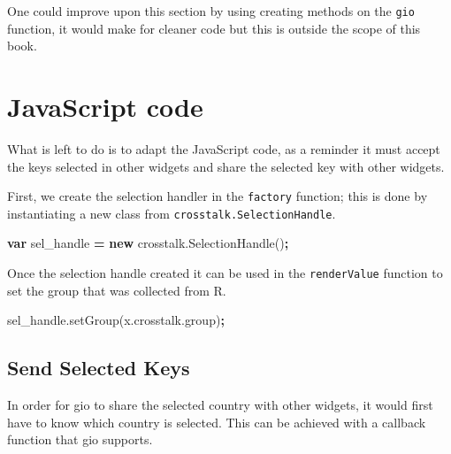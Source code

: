 \documentclass[10pt,]{krantz}
\makeatletter
\newenvironment{Shaded}{\begin{snugshade}}{\end{snugshade}}
\newcommand{\AttributeTok}[1]{\textcolor[rgb]{0.61,0.61,0.61}{#1}}
\newcommand{\KeywordTok}[1]{\textcolor[rgb]{0.27,0.27,0.27}{\textbf{#1}}}
\newcommand{\NormalTok}[1]{#1}
\newcommand{\OperatorTok}[1]{\textcolor[rgb]{0.43,0.43,0.43}{\textbf{#1}}}
\newcommand{\VariableTok}[1]{\textcolor[rgb]{0,0,0}{#1}}
\newenvironment{kframe}{%
\medskip{}
\setlength{\fboxsep}{.8em}
 \def\at@end@of@kframe{}%
 \ifinner\ifhmode%
  \def\at@end@of@kframe{\end{minipage}}%
  \begin{minipage}{\columnwidth}%
 \fi\fi%
 \def\FrameCommand##1{\hskip\@totalleftmargin \hskip-\fboxsep
 \colorbox{shadecolor}{##1}\hskip-\fboxsep
     \hskip-\linewidth \hskip-\@totalleftmargin \hskip\columnwidth}%
 \MakeFramed {\advance\hsize-\width
   \@totalleftmargin\z@ \linewidth\hsize
   \@setminipage}}%
 {\par\unskip\endMakeFramed%
 \at@end@of@kframe}
\renewenvironment{Shaded}{\begin{kframe}}{\end{kframe}}
\newenvironment{rmdblock}[1]
  {
  \begin{itemize}
  \renewcommand{\labelitemi}{
    \raisebox{-.7\height}[0pt][0pt]{
      {\setkeys{Gin}{width=3em,keepaspectratio}\texttt{[image: images/\#1]}}
    }
  }
  \setlength{\fboxsep}{1em}
  \begin{kframe}
  \item
  }
  {
  \end{kframe}
  \end{itemize}
  }
\newenvironment{rmdnote}
  {\begin{rmdblock}{note}}
  {\end{rmdblock}}
\makeatother
\begin{document}
\begin{rmdnote}
One could improve upon this section by using creating methods on the
\texttt{gio} function, it would make for cleaner code but this is
outside the scope of this book.
\end{rmdnote}

\hypertarget{linking-widgets-js}{%
\section{JavaScript code}\label{linking-widgets-js}}

What is left to do is to adapt the JavaScript code, as a reminder it must accept the keys selected in other widgets and share the selected key with other widgets.

First, we create the selection handler in the \texttt{factory} function; this is done by instantiating a new class from \texttt{crosstalk.SelectionHandle}.

\begin{Shaded}
\begin{Highlighting}[]
\KeywordTok{var}\NormalTok{ sel_handle }\OperatorTok{=} \KeywordTok{new} \VariableTok{crosstalk}\NormalTok{.}\AttributeTok{SelectionHandle}\NormalTok{()}\OperatorTok{;}
\end{Highlighting}
\end{Shaded}

Once the selection handle created it can be used in the \texttt{renderValue} function to set the group that was collected from R.

\begin{Shaded}
\begin{Highlighting}[]
\VariableTok{sel_handle}\NormalTok{.}\AttributeTok{setGroup}\NormalTok{(}\VariableTok{x}\NormalTok{.}\VariableTok{crosstalk}\NormalTok{.}\AttributeTok{group}\NormalTok{)}\OperatorTok{;}
\end{Highlighting}
\end{Shaded}

\hypertarget{linking-widgets-send-keys}{%
\subsection{Send Selected Keys}\label{linking-widgets-send-keys}}

In order for gio to share the selected country with other widgets, it would first have to know which country is selected. This can be achieved with a callback function that gio supports.
\end{document}

